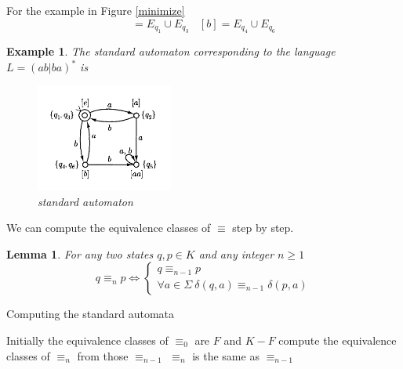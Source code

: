 \documentclass[aps,pra,onecolumn,notitlepage,superscriptaddress]{revtex4-1}
\newtheorem{lemma}{Lemma}
\newtheorem{exa}{Example}
\begin{document}
    For the example in Figure \ref{minimize}
    \begin{equation*}
        [e] = E_{q_1} \cup E_{q_3} \ \ \ \ [b] = E_{q_4} \cup E_{q_6}
    \end{equation*}

    \begin{exa}
        The standard automaton corresponding to the language $L = (ab | ba)^*$ is
        \begin{figure}[H]
            \centering
            \includegraphics[width=0.4\textwidth]{standard.png}
            \caption{standard automaton}
            \label{standard}
        \end{figure}
    \end{exa}

    We can compute the equivalence classes of $\equiv$ step by step.

    \begin{lemma}
        For any two states $q,p \in K$ and any integer $n \geq 1$
        \begin{equation}
            q \equiv_n p \Longleftrightarrow 
            \begin{cases}
                q \equiv_{n-1} p \\ \forall a \in \Sigma \ \delta(q,a) \equiv_{n-1} \delta(p,a)
            \end{cases}
        \end{equation}
    \end{lemma}

    \begin{algorithm}[H]
        \caption{Computing the standard automata}
        \begin{algorithmic}[1]
            \State Initially the equivalence classes of $\equiv_0$ are $F$ and $K - F$
            \Repeat
            \State compute the equivalence classes of $\equiv_n$ from those $\equiv_{n-1}$ 
            \EndFor
            \Until $\equiv_n$ is the same as $\equiv_{n-1}$
        \end{algorithmic}
    \end{algorithm}
\end{document}
